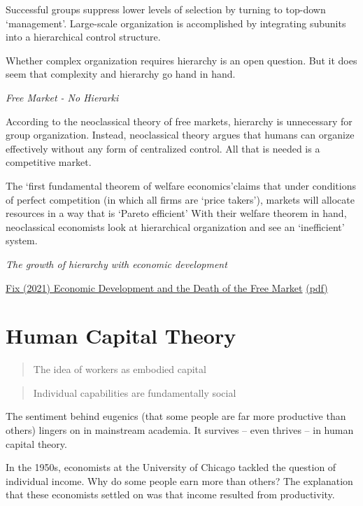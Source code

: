 \documentclass[
]{book}
\begin{document}
Successful groups suppress lower levels of selection by turning to top-down
`management'.
Large-scale organization is accomplished by integrating subunits into
a hierarchical control structure.

Whether complex organization requires hierarchy is an open question. But it
does seem that complexity and hierarchy go hand in hand.

\emph{Free Market - No Hierarki}

According to the neoclassical theory of free markets,
hierarchy is unnecessary for group organization. Instead, neoclassical theory
argues that humans can organize effectively without any form of centralized
control. All that is needed is a competitive market.

The `first fundamental theorem of welfare economics'claims
that under conditions of perfect competition (in which all firms are `price takers'),
markets will allocate resources in a way that is `Pareto efficient'
With their welfare theorem in hand, neoclassical economists look at
hierarchical organization and see an `inefficient' system.

\emph{The growth of hierarchy with economic development}

\href{Fix_2021_Free_Market.pdf}{Fix (2021) Economic Development and the Death of the Free Market}
\href{pdf/Fix_2021_Free_Market.pdf}{(pdf)}

\hypertarget{human-capital-theory}{%
\section{Human Capital Theory}\label{human-capital-theory}}

\begin{quote}
The idea of workers as embodied capital
\end{quote}

\begin{quote}
Individual capabilities are fundamentally social
\end{quote}

The sentiment behind eugenics (that some people are far more productive than others)
lingers on in mainstream academia.
It survives -- even thrives -- in human capital theory.

In the 1950s, economists at the University of Chicago tackled the question of individual income.
Why do some people earn more than others?
The explanation that these economists settled on was that income resulted from productivity.
\end{document}

